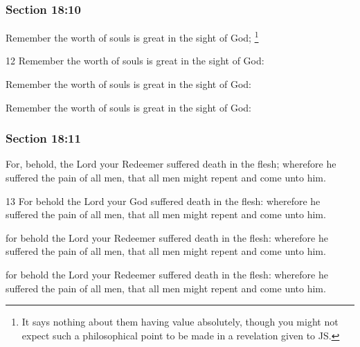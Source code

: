 	\subsubsection{Section 18:10} %
		\label{DC18-10}

		Remember the worth of souls is great in the sight of God;%
			\footnote{%
				It says nothing about them having value absolutely, though you might not expect such a philosophical point to be made in a revelation given to JS.
				}

		\begin{framed}
		\scriptsize
			\begin{compactdesc}
				\item[JSP] 12 Remember the worth of souls is great in the sight of God:
				\item[DC 1835] Remember the worth of souls is great in the sight of God: 
				\item[DC 1844] Remember the worth of souls is great in the sight of God: 
			\end{compactdesc}
		\end{framed}

	\subsubsection{Section 18:11} %
		\label{DC18-11}

		For, behold, the Lord your Redeemer suffered death in the flesh; wherefore he suffered the pain of all men, that all men might repent and come unto him.

		\begin{framed}
		\scriptsize
			\begin{compactdesc}
				\item[JSP] 13 For behold the Lord your God suffered death in the flesh: wherefore he suffered the pain of all men, that all men might repent and come unto him.
				\item[DC 1835] for behold the Lord your Redeemer suffered death in the flesh: wherefore he suffered the pain of all men, that all men might repent and come unto him. 
				\item[DC 1844] for behold the Lord your Redeemer suffered death in the flesh: wherefore he suffered the pain of all men, that all men might repent and come unto him. 
			\end{compactdesc}
		\end{framed}

